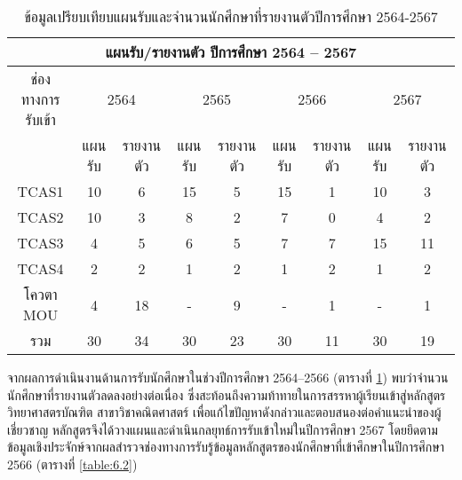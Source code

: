 %

{\footnotesize
\begin{longtable}{ |c|c|c|c|c|c|c|c|c|}
\caption{ข้อมูลเปรียบเทียบแผนรับและจำนวนนักศึกษาที่รายงานตัวปีการศึกษา 2564-2567 }
\label{table:6.1}\\
 \hline
 \multicolumn{9}{|c|}{แผนรับ/รายงานตัว ปีการศึกษา 2564 – 2567} \\
 \hline
 ช่องทางการรับเข้า & \multicolumn{2}{c|}{2564} & \multicolumn{2}{c|}{2565} & \multicolumn{2}{c|}{2566} & \multicolumn{2}{c|}{2567} \\
 \cline{2-9}
  & แผนรับ & รายงานตัว & แผนรับ & รายงานตัว & แผนรับ & รายงานตัว & แผนรับ & รายงานตัว \\
 \hline
  TCAS1 & 10 & 6 & 15 & 5 &  15 &   1  & 10 & 3\\
 \hline
   TCAS2& 10 & 3 & 8 & 2 &  7 &   0 & 4 & 2\\
 \hline
   TCAS3& 4 & 5 & 6 & 5 &  7 &  7  & 15 & 11\\
 \hline
   TCAS4 & 2 & 2 & 1 & 2 & 1  & 2   & 1 & 2 \\
 \hline
 โควตา MOU  & 4 & 18 & - &  9 & -  & 1   &  - & 1\\
 \hline
  รวม  & 30  & 34 & 30 &  23 & 30  &  11  & 30 & 19\\
 \hline
\end{longtable}
}




จากผลการดำเนินงานด้านการรับนักศึกษาในช่วงปีการศึกษา 2564–2566 (ตารางที่ \ref{table:6.1}) พบว่าจำนวนนักศึกษาที่รายงานตัวลดลงอย่างต่อเนื่อง ซึ่งสะท้อนถึงความท้าทายในการสรรหาผู้เรียนเข้าสู่หลักสูตรวิทยาศาสตรบัณฑิต สาขาวิชาคณิตศาสตร์ เพื่อแก้ไขปัญหาดังกล่าวและตอบสนองต่อคำแนะนำของผู้เชี่ยวชาญ หลักสูตรจึงได้วางแผนและดำเนินกลยุทธ์การรับเข้าใหม่ในปีการศึกษา 2567 โดยยึดตามข้อมูลเชิงประจักษ์จากผลสำรวจช่องทางการรับรู้ข้อมูลหลักสูตรของนักศึกษาที่เข้าศึกษาในปีการศึกษา 2566 (ตารางที่ \ref{table:6.2})

